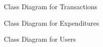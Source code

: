 \documentclass{scrreprt}
\begin{document}
\begin{figure}
	\centering
	\caption{Class Diagram for Transactions}
	\label{fig:transaction-cd}
\end{figure}
\begin{figure}
	\centering
	\caption{Class Diagram for Expenditures}
	\label{fig:expenditure-cd}
\end{figure}
\begin{figure}
	\centering
	\caption{Class Diagram for Users}
	\label{fig:user-cd}
\end{figure}
\end{document}
